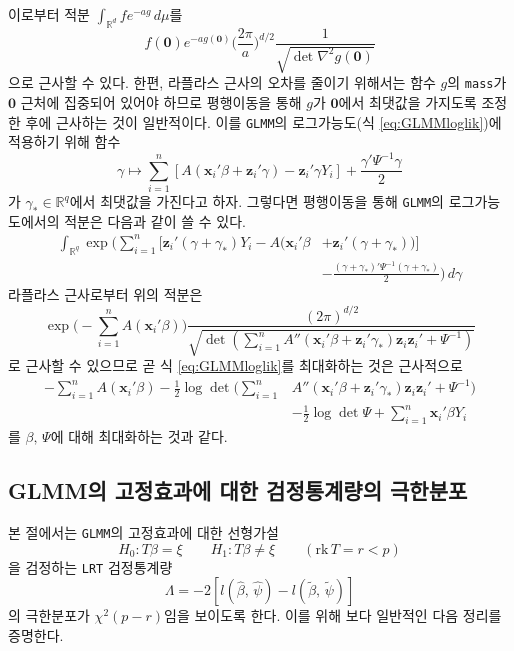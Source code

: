 \documentclass[11pt,onecolumn,twoside,a4size]{gsag3jnl}
\begin{document}
이로부터 적분 $\int_{\mathbb{R}^d}fe^{-ag}\,d\mu$를
\begin{equation}
  f(\mathbf{0})e^{-ag(\mathbf{0})}\bigg(\frac{2\pi}{a}\bigg)^{d/2}\frac{1}{\sqrt{\det\nabla^2g(\mathbf{0})}}
\end{equation}
으로 근사할 수 있다. 한편, 라플라스 근사의 오차를 줄이기 위해서는 함수 $g$의 \texttt{mass}가 $\mathbf{0}$ 근처에 집중되어 있어야 하므로 평행이동을 통해 $g$가 $\mathbf{0}$에서 최댓값을 가지도록 조정한 후에 근사하는 것이 일반적이다. 이를 \texttt{GLMM}의 로그가능도(식 \ref{eq:GLMMloglik})에 적용하기 위해 함수
\begin{equation}
  \gamma\mapsto\sum_{i=1}^n[A(\mathbf{x}_i'\beta+\mathbf{z}_i'\gamma)-\mathbf{z}_i'\gamma Y_i]+\frac{\gamma'\Psi^{-1}\gamma}{2}
\end{equation}
가 $\gamma_*\in\mathbb{R}^q$에서 최댓값을 가진다고 하자. 그렇다면 평행이동을 통해 \texttt{GLMM}의 로그가능도에서의 적분은 다음과 같이 쓸 수 있다.
\begin{align}
  \int_{\mathbb{R}^q}\exp\bigg(\sum_{i=1}^n[\mathbf{z}_i'(\gamma+\gamma_*)Y_i-A(\mathbf{x}_i'\beta&+\mathbf{z}_i'(\gamma+\gamma_*))]\\
  &-\frac{(\gamma+\gamma_*)'\Psi^{-1}(\gamma+\gamma_*)}{2}\bigg)\,d\gamma\nonumber
\end{align}
라플라스 근사로부터 위의 적분은
\begin{equation}
  \exp\bigg(-\sum_{i=1}^nA(\mathbf{x}_i'\beta)\bigg)\frac{(2\pi)^{d/2}}{\sqrt{\det(\sum_{i=1}^nA''(\mathbf{x}_i'\beta+\mathbf{z}_i'\gamma_*)\mathbf{z}_i\mathbf{z}_i'+\Psi^{-1})}}
\end{equation}
로 근사할 수 있으므로 곧 식 \ref{eq:GLMMloglik}를 최대화하는 것은 근사적으로
\begin{align}
  -\sum_{i=1}^nA(\mathbf{x}_i'\beta)-\frac{1}{2}\log\det\bigg(\sum_{i=1}^n&A''(\mathbf{x}_i'\beta+\mathbf{z}_i'\gamma_*)\mathbf{z}_i\mathbf{z}_i'+\Psi^{-1}\bigg)\\
  &-\frac{1}{2}\log\det\Psi+\sum_{i=1}^n\mathbf{x}_i'\beta Y_i\nonumber
\end{align}
를 $\beta,\,\Psi$에 대해 최대화하는 것과 같다.

\subsection{GLMM의 고정효과에 대한 검정통계량의 극한분포}

본 절에서는 \texttt{GLMM}의 고정효과에 대한 선형가설
\begin{equation}\label{eq:linearHypo}
  H_0:T\beta=\xi\qquad H_1:T\beta\ne\xi\qquad(\mathrm{rk}\,T=r<p)
\end{equation}
을 검정하는 \texttt{LRT} 검정통계량
\begin{equation}
  \Lambda=-2[l(\widehat{\beta},\,\widehat{\psi})-l(\widetilde{\beta},\,\widetilde{\psi})]
\end{equation}
의 극한분포가 $\chi^2(p-r)$임을 보이도록 한다. 이를 위해 보다 일반적인 다음 정리를 증명한다.\\
\end{document}
